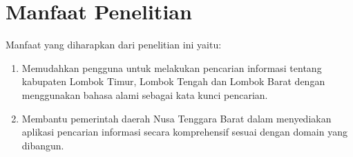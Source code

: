 \section{Manfaat Penelitian}
Manfaat yang diharapkan dari penelitian ini yaitu:
\begin{enumerate}
	\item Memudahkan pengguna untuk melakukan pencarian informasi tentang kabupaten Lombok Timur, Lombok Tengah dan Lombok Barat dengan menggunakan bahasa alami sebagai kata kunci pencarian.
	\item Membantu pemerintah daerah Nusa Tenggara Barat dalam menyediakan aplikasi pencarian informasi secara komprehensif sesuai dengan domain yang dibangun.
\end{enumerate}